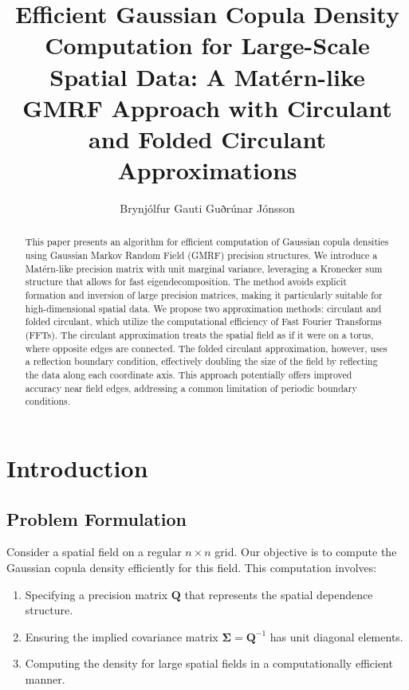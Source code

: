 \documentclass[journal=,manuscript=]{achemso}
\author{Brynjólfur Gauti Guðrúnar Jónsson}
\affiliation{ University of Iceland,  }
\title[]{Efficient Gaussian Copula Density Computation for Large-Scale
Spatial Data: A Matérn-like GMRF Approach with Circulant and Folded
Circulant Approximations}
\providecommand{\tightlist}{%
  \setlength{\itemsep}{0pt}\setlength{\parskip}{0pt}}\usepackage{longtable,booktabs,array}
\begin{document}
\maketitle
\begin{abstract}
This paper presents an algorithm for efficient computation of Gaussian
copula densities using Gaussian Markov Random Field (GMRF) precision
structures. We introduce a Matérn-like precision matrix with unit
marginal variance, leveraging a Kronecker sum structure that allows for
fast eigendecomposition. The method avoids explicit formation and
inversion of large precision matrices, making it particularly suitable
for high-dimensional spatial data. We propose two approximation methods:
circulant and folded circulant, which utilize the computational
efficiency of Fast Fourier Transforms (FFTs). The circulant
approximation treats the spatial field as if it were on a torus, where
opposite edges are connected. The folded circulant approximation,
however, uses a reflection boundary condition, effectively doubling the
size of the field by reflecting the data along each coordinate axis.
This approach potentially offers improved accuracy near field edges,
addressing a common limitation of periodic boundary conditions.
\end{abstract}


\section{Introduction}\label{introduction}

\subsection{Problem Formulation}\label{problem-formulation}

Consider a spatial field on a regular \(n \times n\) grid. Our objective
is to compute the Gaussian copula density efficiently for this field.
This computation involves:

\begin{enumerate}
\def\labelenumi{\arabic{enumi}.}
\tightlist
\item
  Specifying a precision matrix \(\mathbf{Q}\) that represents the
  spatial dependence structure.
\item
  Ensuring the implied covariance matrix
  \(\mathbf{\Sigma} = \mathbf{Q}^{-1}\) has unit diagonal elements.
\item
  Computing the density for large spatial fields in a computationally
  efficient manner.
\end{enumerate}
\end{document}
